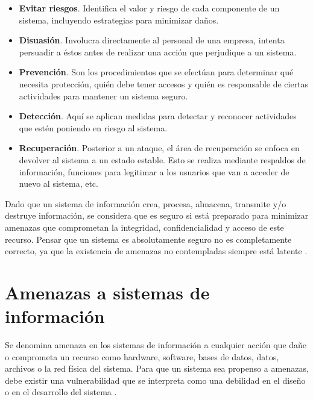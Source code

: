 \begin{itemize}[noitemsep]
	\item \textbf{Evitar riesgos}. Identifica el valor y riesgo de cada componente de un sistema, incluyendo estrategias para minimizar daños.
	\item \textbf{Disuasión}. Involucra directamente al personal de una empresa, intenta persuadir a éstos antes de realizar una acción que perjudique a un sistema.  
	\item \textbf{Prevención}. Son los procedimientos que se efectúan para determinar qué necesita protección, quién debe tener accesos y quién es responsable de ciertas actividades para mantener un sistema seguro.
	\item \textbf{Detección}. Aquí se aplican medidas para detectar y reconocer actividades que estén poniendo en riesgo al sistema.
	\item \textbf{Recuperación}. Posterior a un ataque, el área de recuperación se enfoca en devolver al sistema a un estado estable. Esto se realiza mediante respaldos de información, funciones para legitimar a los usuarios que van a acceder de nuevo al sistema, etc. 
\end{itemize}

Dado que un sistema de información crea, procesa, almacena, transmite y/o destruye información, se considera que es seguro si está preparado para minimizar amenazas que comprometan la integridad, confidencialidad y acceso de este recurso. Pensar que un sistema es absolutamente seguro no es completamente correcto, ya que la existencia de amenazas no contempladas siempre está latente \cite{Nom97,RusSrLeh91}.


\section{Amenazas a sistemas de información}\label{sec:amenazas}

Se denomina amenaza en los sistemas de información a cualquier acción que dañe o comprometa un recurso como hardware, software, bases de datos, datos, archivos o la red física del sistema. Para que un sistema sea propenso a amenazas, debe existir una vulnerabilidad que se interpreta como una debilidad en el diseño o en el desarrollo del sistema \cite{KimSol18}. 

\vspace{0.3cm}

